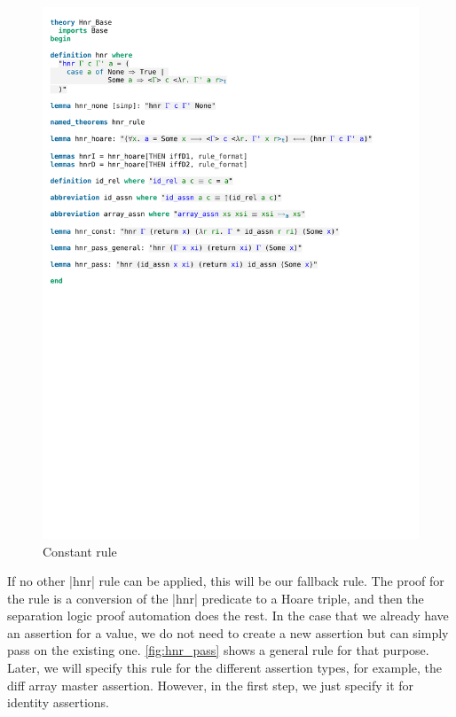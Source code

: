 \begin{figure}[htpb]
    \includegraphics[trim={0 16,8cm 0 12,2cm}, clip, width=1.00\textwidth]{figures/Theory_Hnr_Base.pdf}
    \caption[Constant rule]{Constant rule}
    \label{fig:hnr_const}
\end{figure}

\noindent If no other |hnr| rule can be applied, this will be our fallback rule. The proof for the rule is a conversion of the |hnr| predicate to a Hoare triple, and then the separation logic proof automation does the rest.
In the case that we already have an assertion for a value, we do not need to create a new assertion but can simply pass on the existing one. \autoref{fig:hnr_pass} shows a general rule for that purpose. Later, we will specify this rule for the different assertion types, for example, the diff array master assertion. However, in the first step, we just specify it for identity assertions.

